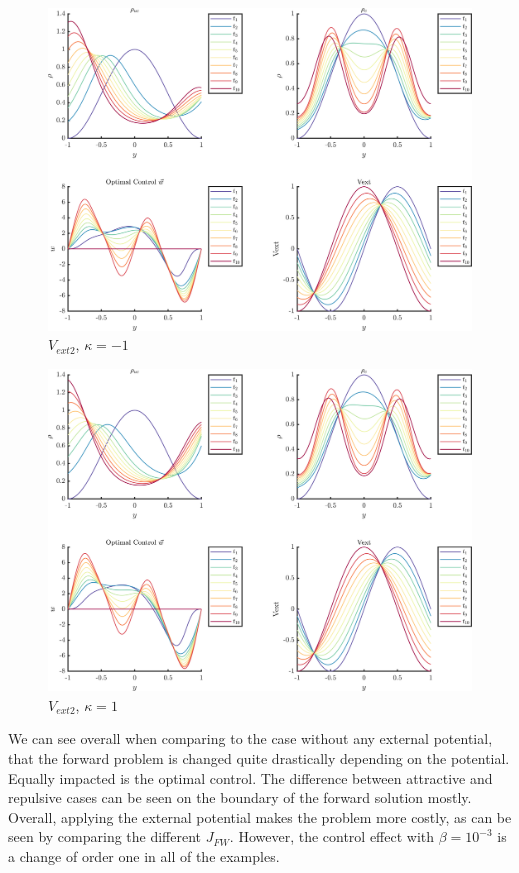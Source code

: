 \documentclass[11pt, a4paper]{article}
\theoremstyle{definition}
\begin{document}
\begin{figure}[h]
	\centering
	\includegraphics[scale=0.055]{Vext2n1.png}
	\caption{$V_{ext2}$, $\kappa = -1$} 
	\label{F2}
\end{figure}
\begin{figure}[h]
	\centering
	\includegraphics[scale=0.055]{Vext21.png}
	\caption{$V_{ext2}$, $\kappa = 1$} 
	\label{F2a}
\end{figure}

We can see overall when comparing to the case without any external potential, that the forward problem is changed quite drastically depending on the potential. Equally impacted is the optimal control. 
The difference between attractive and repulsive cases can be seen on the boundary of the forward solution mostly.
Overall, applying the external potential makes the problem more costly, as can be seen by comparing the different $J_{FW}$. However, the control effect with $\beta = 10^{-3}$ is a change of order one in all of the examples.
\end{document}
